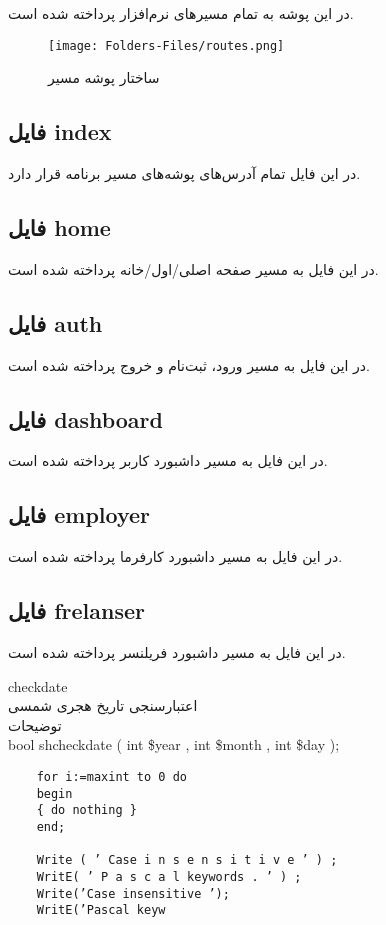در این پوشه به تمام مسیر‌های نرم‌افزار پرداخته شده است.

\begin{figure}[H]
	\texttt{[image: Folders-Files/routes.png]}
	\centering
	\caption{ساختار پوشه مسیر}
	\label{fig:folder-routes}
\end{figure}

\subsection{فایل index}
در این فایل تمام آدرس‌های پوشه‌های مسیر برنامه قرار دارد.

\subsection{فایل home}
در این فایل به مسیر صفحه اصلی/اول/خانه پرداخته شده است.

\subsection{فایل auth}
در این فایل به مسیر ورود، ثبت‌نام و خروج پرداخته شده است.

\subsection{فایل dashboard}
در این فایل به مسیر داشبورد کاربر پرداخته شده است.

\subsection{فایل employer}
در این فایل به مسیر داشبورد کارفرما پرداخته شده است.

\subsection{فایل frelanser}
در این فایل به مسیر داشبورد فریلنسر پرداخته شده است.



checkdate
\\
 اعتبارسنجی تاریخ هجری شمسی
\\
توضیحات
\\
bool shcheckdate ( int \$year , int \$month , int \$day );

\lstset{numbers=left, numberstyle=\tiny, stepnumber=2, numbersep=5pt}

\begin{lstlisting}
	for i:=maxint to 0 do
	begin
	{ do nothing }
	end;
	
	Write ( ’ Case i n s e n s i t i v e ’ ) ;
	WritE( ’ P a s c a l keywords . ’ ) ;
	Write(’Case insensitive ’);
	WritE(’Pascal keyw
\end{lstlisting}

